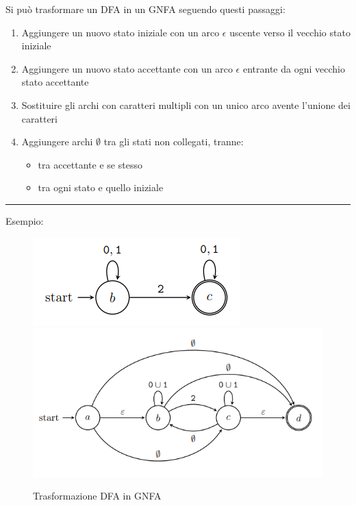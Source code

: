 \documentclass{article}
\begin{document}
\newpage

\noindent Si può trasformare un DFA in un GNFA seguendo questi passaggi:
\begin{enumerate}
    \item Aggiungere un nuovo stato iniziale con un arco $\epsilon$ uscente verso il vecchio stato iniziale
    \item Aggiungere un nuovo stato accettante con un arco $\epsilon$ entrante da ogni vecchio stato accettante
    \item Sostituire gli archi con caratteri multipli con un unico arco avente l'unione dei caratteri
    \item Aggiungere archi $\emptyset$ tra gli stati non collegati, tranne:
    \begin{itemize}
        \item tra accettante e se stesso
        \item tra ogni stato e quello iniziale
    \end{itemize}
\end{enumerate}

\noindent\rule{\textwidth}{0.5pt}\newline

\noindent Esempio:

\begin{figure}[ht]
    \centering
    \includegraphics[width=0.5\linewidth]{GNFA.png}
    \includegraphics[width=\linewidth]{GNFA2.png}
    \caption{Trasformazione DFA in GNFA}
    \label{fig:gnfa}
\end{figure}
\end{document}
